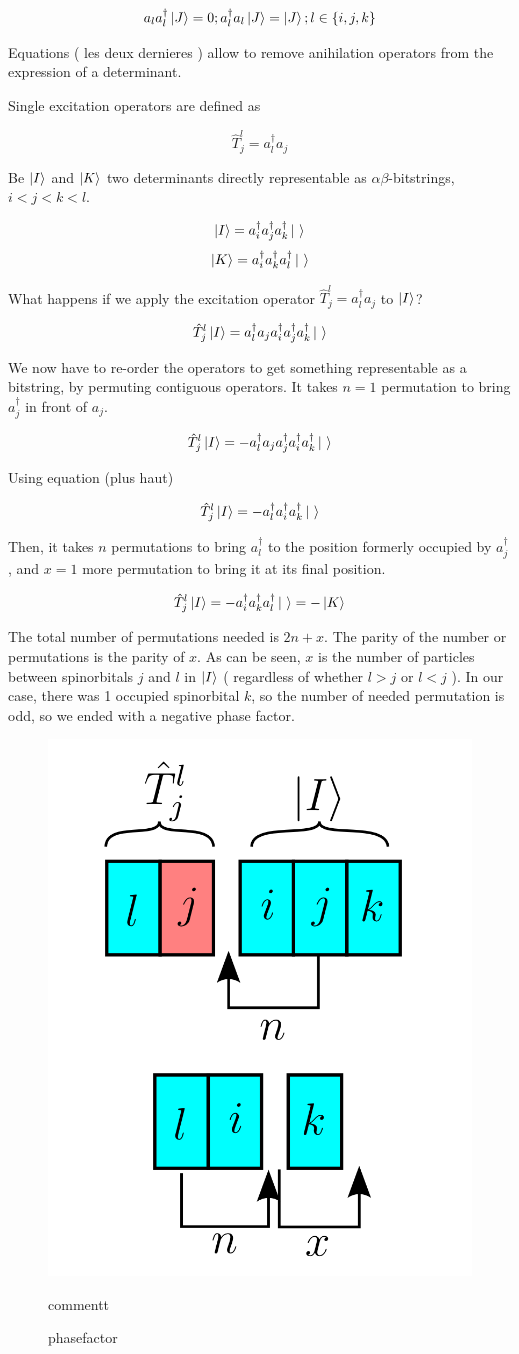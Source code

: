 \documentclass[./thesis.tex]{subfiles}
\begin{document}
$$a_l a^\dagger_l \ket J  = 0 ; a^\dagger_l a_l \ket J  = \ket J; l \in \{i,j,k\}$$


Equations ( les deux dernieres ) allow to remove anihilation operators from the expression of a determinant.



Single excitation operators are defined as

$$\hat T_j^l=a^\dagger_l a_j$$

Be $\ket I$ and $\ket K$ two determinants directly representable as $\alpha \beta$-bitstrings, $i<j<k<l$.

$$\ket I = a^\dagger_i a^\dagger_j a^\dagger_k \ket \ $$
$$\ket K = a^\dagger_i a^\dagger_k a^\dagger_l \ket \  $$


What happens if we apply the excitation operator $\hat T_j^l=a^\dagger_l a_j$ to $\ket I$?


$$\hat T_j^l \ket I = a^\dagger_l a_j a^\dagger_i a^\dagger_j a^\dagger_k \ket \ $$

We now have to re-order the operators to get something representable as a bitstring, by permuting contiguous operators. It takes $n=1$ permutation to bring $a^\dagger_j$ in front of $a_j$.


$$\hat T_j^l \ket I = -a^\dagger_l a_j a^\dagger_j a^\dagger_i a^\dagger_k \ket \ $$

Using equation (plus haut)

$$\hat T_j^l \ket I = -a^\dagger_l a^\dagger_i a^\dagger_k \ket \ $$

Then, it takes $n$ permutations to bring $a^\dagger_l$ to the position formerly occupied by $a^\dagger_j$, and $x=1$ more permutation to bring it at its final position.

$$\hat T_j^l \ket I = -a^\dagger_i a^\dagger_k a^\dagger_l \ket \  = -\ket K$$

The total number of permutations needed is $2n+x$. The parity of the number or permutations is the parity of $x$. As can be seen, $x$ is the number of particles between spinorbitals $j$ and $l$ in $\ket I$ ( regardless of whether $l>j$ or $l<j$ ). In our case, there was 1 occupied spinorbital $k$, so the number of needed permutation is odd, so we ended with a negative phase factor.

\begin{figure}[h!]
	\begin{center}
		\includegraphics[width=0.3\columnwidth]{figures/determinant_driven/phasefactor}
		\caption{
		\label{phasefactor}%
		phasefactor
		}
		commentt
	\end{center}
\end{figure}
\end{document}
